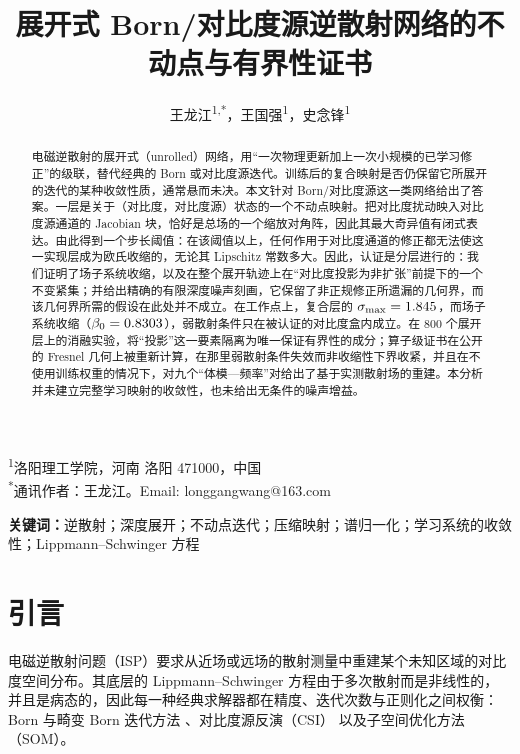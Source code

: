 \documentclass[UTF8,a4paper,11pt]{ctexart}
\newcommand{\numv}[1]{#1}
\begin{document}
\title{展开式 Born/对比度源逆散射网络的不动点与有界性证书}
\author{王龙江\textsuperscript{1,*}，王国强\textsuperscript{1}，史念锋\textsuperscript{1}}
\date{}
\maketitle
\thispagestyle{empty}

\begin{center}
\textsuperscript{1}洛阳理工学院，河南 洛阳 471000，中国\\
\textsuperscript{*}通讯作者：王龙江。Email: longgangwang@163.com
\end{center}

\begin{abstract}
电磁逆散射的展开式（unrolled）网络，用“一次物理更新加上一次小规模的已学习修正”的级联，替代经典的 Born 或对比度源迭代。训练后的复合映射是否仍保留它所展开的迭代的某种收敛性质，通常悬而未决。本文针对 Born/对比度源这一类网络给出了答案。一层是关于（对比度，对比度源）状态的一个不动点映射。把对比度扰动映入对比度源通道的 Jacobian 块，恰好是总场的一个缩放对角阵，因此其最大奇异值有闭式表达。由此得到一个步长阈值：在该阈值以上，任何作用于对比度通道的修正都无法使这一实现层成为欧氏收缩的，无论其 Lipschitz 常数多大。因此，认证是分层进行的：我们证明了场子系统收缩，以及在整个展开轨迹上在“对比度投影为非扩张”前提下的一个不变紧集；并给出精确的有限深度噪声刻画，它保留了非正规修正所遗漏的几何界，而该几何界所需的假设在此处并不成立。在工作点上，复合层的 $\sigma_{\max}=\numv{\NumPhysSigma}$，而场子系统收缩（$\beta_0=\numv{\betacert}$），弱散射条件只在被认证的对比度盒内成立。在 800 个展开层上的消融实验，将“投影”这一要素隔离为唯一保证有界性的成分；算子级证书在公开的 Fresnel 几何上被重新计算，在那里弱散射条件失效而非收缩性下界收紧，并且在不使用训练权重的情况下，对九个“体模—频率”对给出了基于实测散射场的重建。本分析并未建立完整学习映射的收敛性，也未给出无条件的噪声增益。
\end{abstract}

\noindent\textbf{关键词：}逆散射；深度展开；不动点迭代；压缩映射；谱归一化；学习系统的收敛性；Lippmann--Schwinger 方程

\section{引言}
电磁逆散射问题（ISP）要求从近场或远场的散射测量中重建某个未知区域的对比度空间分布。其底层的 Lippmann--Schwinger 方程由于多次散射而是非线性的，并且是病态的，因此每一种经典求解器都在精度、迭代次数与正则化之间权衡：Born 与畸变 Born 迭代方法 \cite{born_lit}、对比度源反演（CSI）\cite{csi_lit} 以及子空间优化方法（SOM）\cite{som_lit}。
\end{document}
